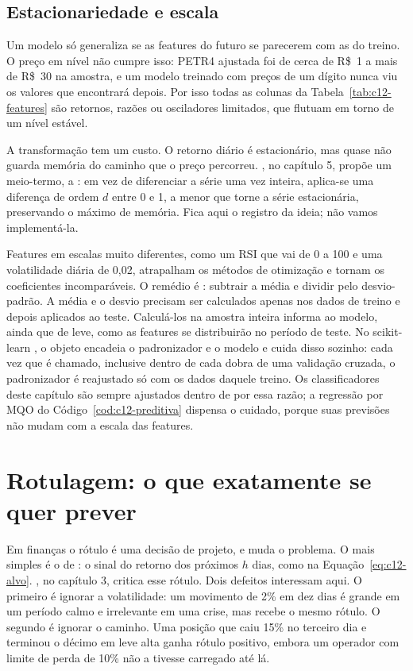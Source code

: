 \subsection{Estacionariedade e escala}

Um modelo só generaliza se as features do futuro se parecerem com as do treino. O preço em nível não cumpre isso: PETR4 ajustada foi de cerca de R\$~1 a mais de R\$~30 na amostra, e um modelo treinado com preços de um dígito nunca viu os valores que encontrará depois. Por isso todas as colunas da Tabela~\ref{tab:c12-features} são retornos, razões ou osciladores limitados, que flutuam em torno de um nível estável.

A transformação tem um custo. O retorno diário é estacionário, mas quase não guarda memória do caminho que o preço percorreu. \citet{lopezdeprado2018}, no capítulo 5, propõe um meio-termo, a : em vez de diferenciar a série uma vez inteira, aplica-se uma diferença de ordem $d$ entre 0 e 1, a menor que torne a série estacionária, preservando o máximo de memória. Fica aqui o registro da ideia; não vamos implementá-la.

Features em escalas muito diferentes, como um RSI que vai de 0 a 100 e uma volatilidade diária de 0,02, atrapalham os métodos de otimização e tornam os coeficientes incomparáveis. O remédio é : subtrair a média e dividir pelo desvio-padrão. A média e o desvio precisam ser calculados apenas nos dados de treino e depois aplicados ao teste. Calculá-los na amostra inteira informa ao modelo, ainda que de leve, como as features se distribuirão no período de teste. No scikit-learn \citep{pedregosa2011}, o objeto  encadeia o padronizador e o modelo e cuida disso sozinho: cada vez que  é chamado, inclusive dentro de cada dobra de uma validação cruzada, o padronizador é reajustado só com os dados daquele treino. Os classificadores deste capítulo são sempre ajustados dentro de  por essa razão; a regressão por MQO do Código~\ref{cod:c12-preditiva} dispensa o cuidado, porque suas previsões não mudam com a escala das features.

\section{Rotulagem: o que exatamente se quer prever}

Em finanças o rótulo é uma decisão de projeto, e muda o problema. O mais simples é o de : o sinal do retorno dos próximos $h$ dias, como na Equação~\eqref{eq:c12-alvo}. \citet{lopezdeprado2018}, no capítulo 3, critica esse rótulo. Dois defeitos interessam aqui. O primeiro é ignorar a volatilidade: um movimento de 2\% em dez dias é grande em um período calmo e irrelevante em uma crise, mas recebe o mesmo rótulo. O segundo é ignorar o caminho. Uma posição que caiu 15\% no terceiro dia e terminou o décimo em leve alta ganha rótulo positivo, embora um operador com limite de perda de 10\% não a tivesse carregado até lá.

